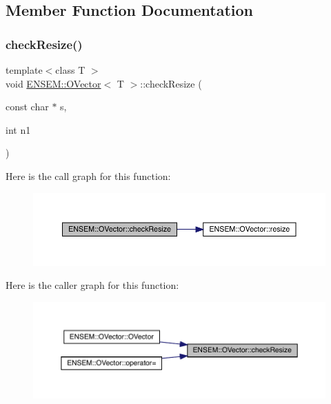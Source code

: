 \subsection{Member Function Documentation}
\mbox{\label{classENSEM_1_1OVector_a95545451bb9d6be83ba32ad3dc2dab42}} 
\subsubsection{\texorpdfstring{checkResize()}{checkResize()}\hspace{0.1cm}{\footnotesize\ttfamily [1/9]}}
{\footnotesize\ttfamily template$<$class T $>$ \\
void \mbox{\hyperlink{classENSEM_1_1OVector}{E\+N\+S\+E\+M\+::\+O\+Vector}}$<$ T $>$\+::check\+Resize (\begin{DoxyParamCaption}\item[{const char $\ast$}]{s,  }\item[{int}]{n1 }\end{DoxyParamCaption})\hspace{0.3cm}{\ttfamily [inline]}}

Here is the call graph for this function\+:
\nopagebreak
\begin{figure}[H]
\begin{center}
\leavevmode
\includegraphics[width=350pt]{d0/d8d/classENSEM_1_1OVector_a95545451bb9d6be83ba32ad3dc2dab42_cgraph}
\end{center}
\end{figure}
Here is the caller graph for this function\+:
\nopagebreak
\begin{figure}[H]
\begin{center}
\leavevmode
\includegraphics[width=350pt]{d0/d8d/classENSEM_1_1OVector_a95545451bb9d6be83ba32ad3dc2dab42_icgraph}
\end{center}
\end{figure}
\mbox{\label{classENSEM_1_1OVector_a95545451bb9d6be83ba32ad3dc2dab42}} 
